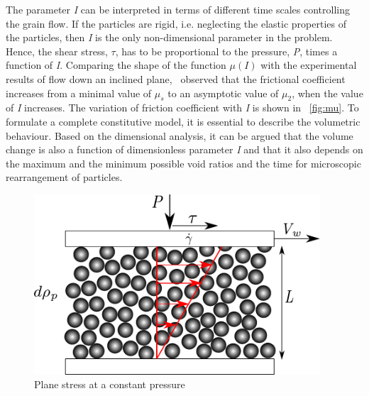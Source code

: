 The parameter \textit{I} can be interpreted in terms of different time scales 
controlling the grain flow. If the particles are rigid, i.e. neglecting the 
elastic properties of the particles, then \textit{I} is the only 
non-dimensional parameter in the problem. Hence, the shear stress, $\tau$, has 
to be proportional to the pressure, \textit{P}, times a function of \textit{I}. 
Comparing the shape of the function $\mu(\textit{I})$ with the experimental 
results of flow down an inclined plane,~\citet{Jop2006} observed that the 
frictional coefficient increases from a minimal value of $\mu_{\textit{s}}$ to 
an asymptotic value of $\mu_{2}$, when the value of \textit{I} increases. The 
variation of friction coefficient with \textit{I} is shown in 
~\cref{fig:mu}. To formulate a complete constitutive model, it is 
essential to describe the volumetric behaviour. Based on the dimensional 
analysis, it can be argued that the volume change is also a function of 
dimensionless parameter \textit{I} and that it also depends on the maximum and 
the minimum possible void ratios and the time for microscopic rearrangement of 
particles. 
\begin{figure}[htbp]
\centering
\includegraphics[width=0.95\textwidth]{Rheology}
\caption{Plane stress at a constant pressure}
\label{fig:rheology}
\end{figure}

